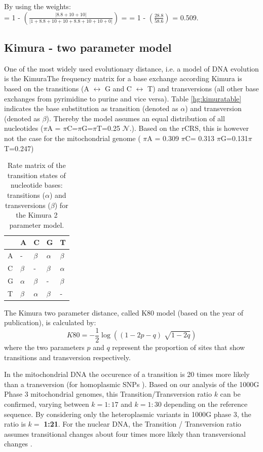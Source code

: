 By using the weights: \\
= 1 - $\left(  \frac{\left| 8.8 + 10 + 10 \right|}{\left| 1 + 8.8 + 10 + 10 + 8.8 + 10 + 10  + 0 \right|}  \right)$  = 
= 1 -  $\left(  \frac{28.8}{58.6} \right)$ = 0.509. 
\subsection{Kimura - two parameter model}
One of the most widely used evolutionary distance, i.e. a model of DNA evolution is the KimuraThe frequency matrix for a base exchange according Kimura\cite{Kimura1980} is based on the transitions (A $\leftrightarrow$ G and C $\leftrightarrow$ T) and transversions (all other base exchanges from pyrimidine to purine and vice versa). Table \ref{hg:kimuratable} indicates the base substitution as transition (denoted as $\alpha$) and transversion (denoted as $\beta$). Thereby the model assumes an equal distribution of all nucleotides ($\pi$A = $\pi$C=$\pi$G=$\pi$T=0.25 $\mathcal{N}.$). Based on the rCRS, this is however not the case for the mitochondrial genome ( $\pi$A = 0.309 $\pi$C= 0.313 $\pi$G=0.131$\pi$T=0.247)
\begin{table}[h]

\centering
\caption{Rate matrix of the transition states of nucleotide bases: transitions ($\alpha$) and transversions ($\beta$) for the Kimura 2 parameter model.}
\label{mtDNAsource}
\begin{tabular}{lllll}
\hline
   & A&  C   &G  & T\\
\hline

A  & - & $\beta$    & $\alpha$  & $\beta$ \\
C  & $\beta$ &  -   & $\beta$  & $\alpha$ \\
G  & $\alpha$ &  $\beta$    & - & $\beta$ \\
T  & $\beta$ &  $\alpha$    & $\beta$  & - \\
\end{tabular}
\end{table}

The Kimura two parameter distance, called K80 model (based on the year of publication), is calculated by:
\begin{equation}
K80 = - \frac{1}{2} \log((1- 2p -q ) \sqrt[]{1-2q})
\end{equation}
where the two parameters $p$ and $q$ represent the proportion of sites that show transitions and transversion respectively.

In the mitochondrial DNA the occurence of a transition is 20 times more likely than a transversion (for homoplasmic SNPs \cite{Guo2012}). Based on our analysis of the 1000G Phase 3 mitochondrial genomes, this Transition/Transversion ratio $k$ can be confirmed, varying between $k=1:17$ and $k=1:30$ depending on the reference sequence. By considering only the heteroplasmic variants in 1000G phase 3, the ratio is $k=$ \textbf{1:21}. For the nuclear DNA, the Transition / Transversion ratio assumes transitional changes about four times more likely than transversional changes \cite{salemi2009the}. 


